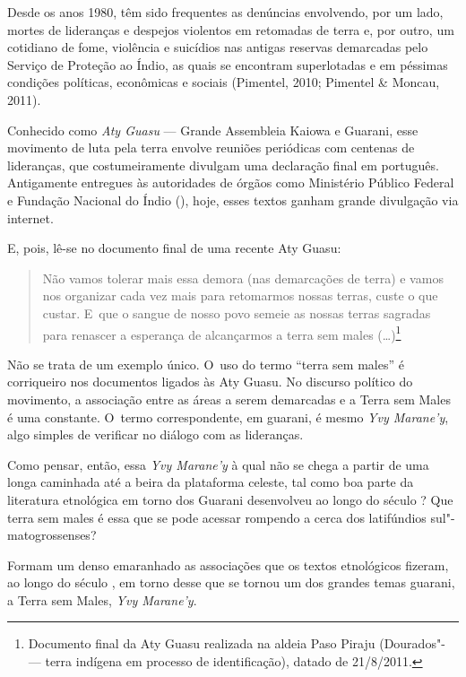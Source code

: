 Desde os anos 1980, têm sido frequentes as denúncias envolvendo, por um
lado, mortes de lideranças e despejos violentos em retomadas de terra
e, por outro, um cotidiano de fome, violência e suicídios nas antigas
reservas demarcadas pelo Serviço de Proteção ao Índio, as quais se
encontram superlotadas e em péssimas condições políticas, econômicas e
sociais (Pimentel, 2010; Pimentel \& Moncau, 2011).

Conhecido como \emph{Aty Guasu} --- Grande Assembleia Kaiowa e Guarani, esse
movimento de luta pela terra envolve reuniões periódicas com centenas
de lideranças, que costumeiramente divulgam uma declaração final em
português. Antigamente entregues às autoridades de órgãos como
Ministério Público Federal e Fundação Nacional do Índio (), hoje,
esses textos ganham grande divulgação via internet.

E, pois, lê-se no documento final de uma recente Aty Guasu:

\begin{quote}
\noindent
Não vamos tolerar mais essa demora (nas demarcações de terra) e vamos
nos organizar cada vez mais para retomarmos nossas terras, custe o que
custar. E~que o sangue de nosso povo semeie as nossas terras sagradas
para renascer a esperança de alcançarmos a terra sem males
(\ldots{})\footnote{Documento final da Aty Guasu realizada na aldeia Paso
Piraju (Dourados"- --- terra indígena em processo de identificação),
datado de 21/8/2011.}
\end{quote}

Não se trata de um exemplo único. O~uso do termo ``terra sem males'' é
corriqueiro nos documentos ligados às Aty Guasu. No discurso político
do movimento, a associação entre as áreas a serem demarcadas e a Terra
sem Males é uma constante. O~termo correspondente, em guarani, é mesmo
\emph{Yvy Marane’y}, algo simples de verificar no diálogo com as lideranças.

Como pensar, então, essa \emph{Yvy Marane’y} à qual não se chega a partir de
uma longa caminhada até a beira da plataforma celeste, tal como boa
parte da literatura etnológica em torno dos Guarani desenvolveu ao
longo do século ? Que terra sem males é essa que se pode acessar
rompendo a cerca dos latifúndios sul"-matogrossenses?

Formam um denso emaranhado as associações que os textos etnológicos
fizeram, ao longo do século , em torno desse que se tornou um dos
grandes temas guarani, a Terra sem Males, \emph{Yvy Marane’y}.

